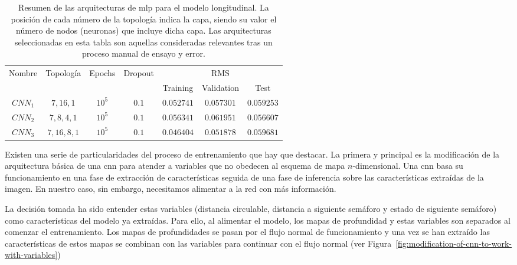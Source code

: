 \begin{table*}
	\caption[Resumen de las arquitecturas \ac{mlp} para el modelo longitudinal]{Resumen de las arquitecturas de \ac{mlp} para el modelo longitudinal. La posición de cada número de la topología indica la capa, siendo su valor el número de nodos (neuronas) que incluye dicha capa. Las arquitecturas seleccionadas en esta tabla son aquellas consideradas relevantes tras un proceso manual de ensayo y error.}
	\label{tbl:lc-cnn-architectures}
	\begin{tabular}{ccccccc}
		\hline
		\multirow{2}{*}{Nombre} & \multirow{2}{*}{Topología} & \multirow{2}{*}{Epochs} & \multirow{2}{*}{Dropout} & \multicolumn{3}{c}{RMS}      \\
		&                            &                         &                          & Training & Validation & Test \\ \hline
		$CNN_1$ & $7, 16, 1$                 & $10^5$                  & $0.1$                    & $0.052741$      & $0.057301$        & $0.059253$  \\
		$CNN_2$ & $7, 8, 4, 1$               & $10^5$                  & $0.1$                    & $0.056341$      & $0.061951$        & $0.056607$  \\
		$CNN_3$ & $7, 16, 8, 1$              & $10^5$                  & $0.1$                    & $0.046404$      & $0.051878$        & $0.059681$  \\
	\end{tabular}
\end{table*}

Existen una serie de particularidades del proceso de entrenamiento que hay que destacar. La primera y principal es la modificación de la arquitectura básica de una \ac{cnn} para atender a variables que no obedecen al esquema de mapa $n$-dimensional. Una \ac{cnn} basa su funcionamiento en una fase de extracción de características seguida de una fase de inferencia sobre las características extraídas de la imagen. En nuestro caso, sin embargo, necesitamos alimentar a la red con más información.

La decisión tomada ha sido entender estas variables (distancia circulable, distancia a siguiente semáforo y estado de siguiente semáforo) como características del modelo ya extraídas. Para ello, al alimentar el modelo, los mapas de profundidad y estas variables son separados al comenzar el entrenamiento. Los mapas de profundidades se pasan por el flujo normal de funcionamiento y una vez se han extraído las características de estos mapas se combinan con las variables para continuar con el flujo normal (ver Figura~\ref{fig:modification-of-cnn-to-work-with-variables})

